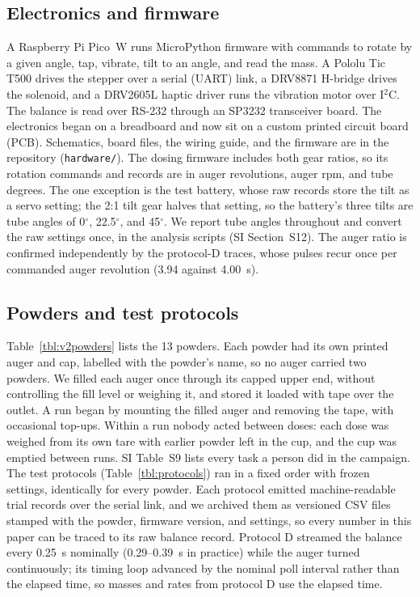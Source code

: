 \documentclass[twoside,twocolumn,9pt]{article}
\begin{document}
\subsection{Electronics and firmware}
A Raspberry Pi Pico~W runs MicroPython firmware with commands to rotate by a given angle, tap, vibrate, tilt to an angle, and read the mass. A Pololu Tic T500 drives the stepper over a serial (UART) link, a DRV8871 H-bridge drives the solenoid, and a DRV2605L haptic driver runs the vibration motor over I$^2$C. The balance is read over RS-232 through an SP3232 transceiver board. The electronics began on a breadboard and now sit on a custom printed circuit board (PCB). Schematics, board files, the wiring guide, and the firmware are in the repository (\texttt{hardware/}). The dosing firmware includes both gear ratios, so its rotation commands and records are in auger revolutions, auger rpm, and tube degrees. The one exception is the test battery, whose raw records store the tilt as a servo setting; the 2:1 tilt gear halves that setting, so the battery's three tilts are tube angles of 0$^\circ$, 22.5$^\circ$, and 45$^\circ$. We report tube angles throughout and convert the raw settings once, in the analysis scripts (SI Section~S12). The auger ratio is confirmed independently by the protocol-D traces, whose pulses recur once per commanded auger revolution (3.94 against 4.00~s).

\subsection{Powders and test protocols}
Table~\ref{tbl:v2powders} lists the 13 powders. Each powder had its own printed auger and cap, labelled with the powder's name, so no auger carried two powders. We filled each auger once through its capped upper end, without controlling the fill level or weighing it, and stored it loaded with tape over the outlet. A run began by mounting the filled auger and removing the tape, with occasional top-ups. Within a run nobody acted between doses: each dose was weighed from its own tare with earlier powder left in the cup, and the cup was emptied between runs. SI Table~S9 lists every task a person did in the campaign. The test protocols (Table~\ref{tbl:protocols}) ran in a fixed order with frozen settings, identically for every powder. Each protocol emitted machine-readable trial records over the serial link, and we archived them as versioned CSV files stamped with the powder, firmware version, and settings, so every number in this paper can be traced to its raw balance record. Protocol D streamed the balance every 0.25~s nominally (0.29--0.39~s in practice) while the auger turned continuously; its timing loop advanced by the nominal poll interval rather than the elapsed time, so masses and rates from protocol D use the elapsed time.
\end{document}
